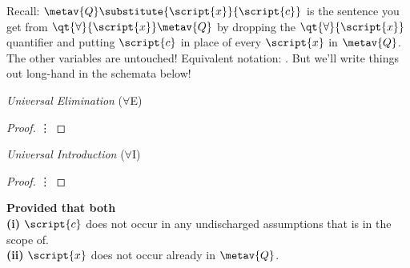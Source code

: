 Recall: $\metav{Q}\substitute{\script{x}}{\script{c}}$ is the sentence you get from $\qt{\forall}{\script{x}}\metav{Q}$ by dropping the $\qt{\forall}{\script{x}}$ quantifier and putting $\script{c}$ in place of every $\script{x}$ in $\metav{Q}$. The other variables are untouched! Equivalent notation: \hspace{.15em}. But we'll write things out long-hand in the schemata below! 




\begin{multicols}{2}

\textit{Universal Elimination} ($\forall$E) 

\begin{proof}
	 {\hspace{2em} \vdots}
	 
\end{proof}


\vspace{2.5em}

\textit{Universal Introduction} ($\forall$I) 

\begin{proof}
	 {\hspace{2em} \vdots}
	 
\end{proof}

\textbf{Provided that both} \\
\textbf{(i)} $\script{c}$ does not occur in any undischarged assumptions that  is in the scope of. \\
\textbf{(ii)} $\script{x}$ does not occur already in $\metav{Q}$.




\end{multicols}
